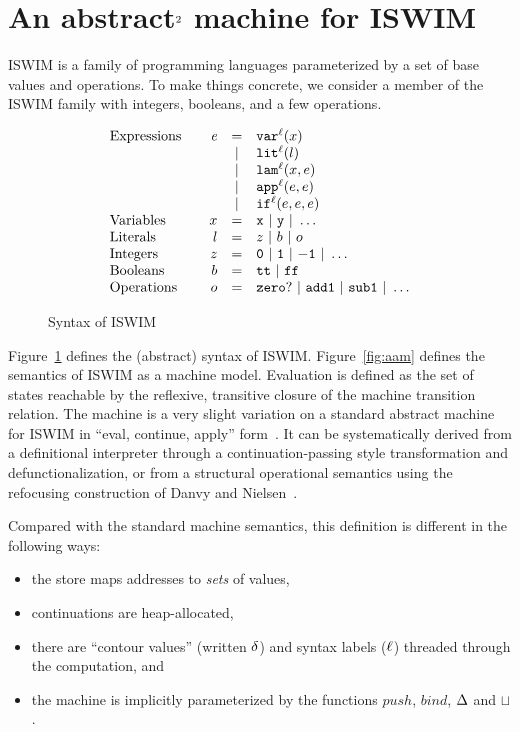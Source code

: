 \documentclass[preprint,onecolumn,9pt]{sigplanconf} %
\begin{document}
\newpage
\section{An abstract$^{\text 2}$ machine for ISWIM}
\label{sec:aam}


ISWIM is a family of programming languages parameterized by a set of
base values and operations.  To make things concrete, we consider a
member of the ISWIM family with integers, booleans, and a few
operations.

\begin{figure}
\[
\begin{array}{l@{\qquad}rcl}
\text{Expressions} & \mathit{e} &=& \svar[^\mlab]\mvar\\
&&|& \slit[^\mlab]\mlit\\
&&|& \slam[^\mlab]\mvar\mexp\\
&&|& \sapp[^\mlab]\mexp\mexp \\
&&|& \sif[^\mlab]\mexp\mexp\mexp \\
\text{Variables}&\mvar &=& \syntax{x}\ |\ \syntax{y}\ |\ \dots\\
\text{Literals}&\mlit &=& \mnum\ |\ \mbln\ |\ \mop\\
\text{Integers}&\mnum &=& \syntax{0}\ |\ \syntax{1}\ |\ \syntax{-1}\ |\ \dots\\
\text{Booleans}&\mbln &=& \strue\ |\ \sfalse\\
\text{Operations}&\mop &=& \syntax{zero?}\ |\ \syntax{add1}\ |\ \syntax{sub1}\ |\ \dots
\end{array}
\]
\caption{Syntax of ISWIM}
\label{fig:syntax}
\end{figure}

Figure~\ref{fig:syntax} defines the (abstract) syntax of ISWIM.
Figure~\ref{fig:aam} defines the semantics of ISWIM as a machine
model.  Evaluation is defined as the set of states reachable by the
reflexive, transitive closure of the machine transition relation.  The
machine is a very slight variation on a standard abstract machine for
ISWIM in ``eval, continue, apply''
form~\cite{dvanhorn:Danvy:DSc}.  It can be
systematically derived from a definitional interpreter through a
continuation-passing style transformation and defunctionalization, or
from a structural operational semantics using the refocusing
construction of Danvy and
Nielsen~\cite{dvanhorn:Danvy-Nielsen:RS-04-26}.

Compared with the standard machine semantics, this definition is
different in the following ways:
\begin{itemize}
\item the store maps addresses to \emph{sets} of values,
\item continuations are heap-allocated,
\item there are ``contour values'' (written ${\delta}$) and syntax
  labels (${\ell}$) threaded through the computation, and
\item the machine is implicitly parameterized by the functions
  $\mathit{push}$, $\mathit{bind}$, $\Delta$ and $\sqcup$.
\end{itemize}
\end{document}
